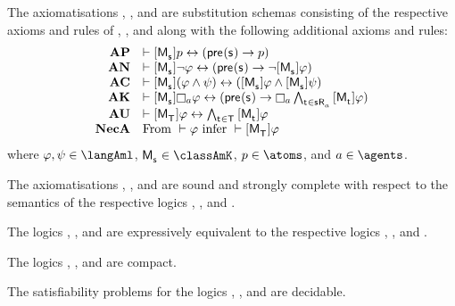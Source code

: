 \begin{definition}
The axiomatisations \axiomAmlK{}, \axiomAmlKFF{}, and \axiomAmlS{} are substitution schemas consisting of the respective axioms and rules of \axiomK{}, \axiomKFF{}, and \axiomS{} along with the following additional axioms and rules:
$$
\begin{array}{rl}
    {\bf AP} & \proves \actionA{\aPModel{\aStateS}} \atomP \iff (\aPrecondition(\aStateS) \implies \atomP)\\
    {\bf AN} & \proves \actionA{\aPModel{\aStateS}} \lnot \phi \iff (\aPrecondition(\aStateS) \implies \lnot \actionA{\aPModel{\aStateS}} \phi)\\
    {\bf AC} & \proves \actionA{\aPModel{\aStateS}} (\phi \land \psi) \iff (\actionA{\aPModel{\aStateS}} \phi \land \actionA{\aPModel{\aStateS}} \psi)\\
    {\bf AK} & \proves \actionA{\aPModel{\aStateS}} \necessaryA \phi \iff (\aPrecondition(\aStateS) \implies \necessaryA \bigwedge_{\aStateT \in \aSuccessorsA{\aStateS}} \actionA{\aPModel{\aStateT}} \phi)\\
    {\bf AU} & \proves \actionA{\aPModel{\aStatesT}} \phi \iff \bigwedge_{\aStateT \in \aStatesT} \actionA{\aPModel{\aStateT}} \phi\\
    {\bf NecA} & \text{From } \proves \phi \text{ infer } \proves \actionA{\aPModel{\aStatesT}} \phi
\end{array}
$$
where $\phi, \psi \in \langAml$, $\aPModel{\aStateS} \in \classAmK$, $\atomP \in \atoms$, and $\agentA \in \agents$.
\end{definition}

\begin{proposition}
The axiomatisations \axiomAmlK{}, \axiomAmlKFF{}, and \axiomAmlS{} are sound and strongly complete with respect to the semantics of the respective logics \logicAmlK{}, \logicAmlKFF{}, and \logicAmlS{}.
\end{proposition}

\begin{proposition}\label{aml-expressive-equivalence}
The logics \logicAmlK{}, \logicAmlKFF{}, and \logicAmlS{} are expressively equivalent to the respective logics \logicK{}, \logicKFF{}, and \logicS{}.
\end{proposition}

\begin{proposition}
The logics \logicAmlK{}, \logicAmlKFF{}, and \logicAmlS{} are compact.
\end{proposition}

\begin{proposition}
The satisfiability problems for the logics \logicAmlK{}, \logicAmlKFF{}, and \logicAmlS{} are decidable.
\end{proposition}
